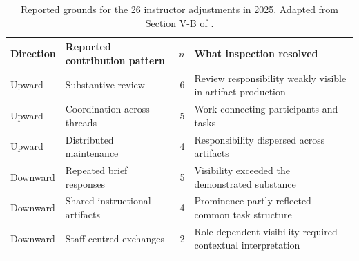\begin{table}[htbp]
\caption{Reported grounds for the 26 instructor adjustments in 2025. Adapted from Section V-B of \citet{seetmanuscript}.}
\label{tab:ch7-reasons}
\small\renewcommand{\arraystretch}{1.17}
\begin{tabularx}{\linewidth}{@{}>{\raggedright\arraybackslash}p{18mm}>{\raggedright\arraybackslash}Xr>{\raggedright\arraybackslash}p{39mm}@{}}\toprule
Direction & Reported contribution pattern & $n$ & What inspection resolved\\\midrule
Upward & Substantive review & 6 & Review responsibility weakly visible in artifact production\\
Upward & Coordination across threads & 5 & Work connecting participants and tasks\\
Upward & Distributed maintenance & 4 & Responsibility dispersed across artifacts\\\addlinespace
Downward & Repeated brief responses & 5 & Visibility exceeded the demonstrated substance\\
Downward & Shared instructional artifacts & 4 & Prominence partly reflected common task structure\\
Downward & Staff-centred exchanges & 2 & Role-dependent visibility required contextual interpretation\\\bottomrule
\end{tabularx}
\end{table}
